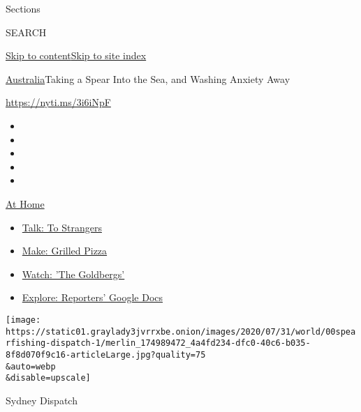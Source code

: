 Sections

SEARCH

\protect\hyperlink{site-content}{Skip to
content}\protect\hyperlink{site-index}{Skip to site index}

\href{/section/world/australia}{Australia}\textbar{}Taking a Spear Into
the Sea, and Washing Anxiety Away

\href{https://nyti.ms/3i6iNpF}{https://nyti.ms/3i6iNpF}

\begin{itemize}
\item
\item
\item
\item
\item
\end{itemize}

\href{https://www.nytimes3xbfgragh.onion/spotlight/at-home?action=click\&pgtype=Article\&state=default\&region=TOP_BANNER\&context=at_home_menu}{At
Home}

\begin{itemize}
\tightlist
\item
  \href{https://www.nytimes3xbfgragh.onion/2020/08/03/well/family/the-benefits-of-talking-to-strangers.html?action=click\&pgtype=Article\&state=default\&region=TOP_BANNER\&context=at_home_menu}{Talk:
  To Strangers}
\item
  \href{https://www.nytimes3xbfgragh.onion/2020/08/01/at-home/coronavirus-make-pizza-on-a-grill.html?action=click\&pgtype=Article\&state=default\&region=TOP_BANNER\&context=at_home_menu}{Make:
  Grilled Pizza}
\item
  \href{https://www.nytimes3xbfgragh.onion/2020/07/31/arts/television/goldbergs-abc-stream.html?action=click\&pgtype=Article\&state=default\&region=TOP_BANNER\&context=at_home_menu}{Watch:
  'The Goldbergs'}
\item
  \href{https://www.nytimes3xbfgragh.onion/interactive/2020/at-home/even-more-reporters-editors-diaries-lists-recommendations.html?action=click\&pgtype=Article\&state=default\&region=TOP_BANNER\&context=at_home_menu}{Explore:
  Reporters' Google Docs}
\end{itemize}

\texttt{[image: https://static01.graylady3jvrrxbe.onion/images/2020/07/31/world/00spearfishing-dispatch-1/merlin\_174989472\_4a4fd234-dfc0-40c6-b035-8f8d070f9c16-articleLarge.jpg?quality=75\\\&auto=webp\\\&disable=upscale]}

Sydney Dispatch

